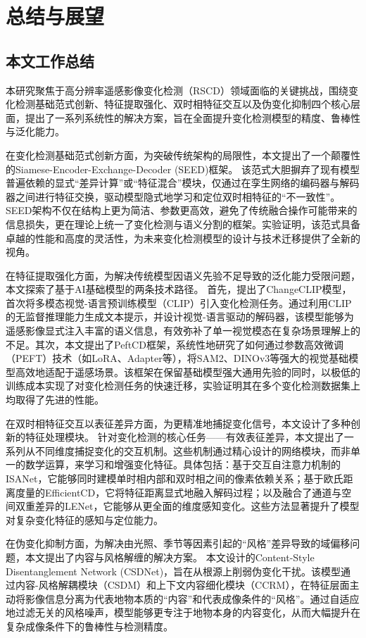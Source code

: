 
\chapter{总结与展望}

\section{本文工作总结}

本研究聚焦于高分辨率遥感影像变化检测（RSCD）领域面临的关键挑战，围绕变化检测基础范式创新、特征提取强化、双时相特征交互以及伪变化抑制四个核心层面，提出了一系列系统性的解决方案，旨在全面提升变化检测模型的精度、鲁棒性与泛化能力。

在变化检测基础范式创新方面，为突破传统架构的局限性，本文提出了一个颠覆性的Siamese-Encoder-Exchange-Decoder (SEED)框架。 该范式大胆摒弃了现有模型普遍依赖的显式“差异计算”或“特征混合”模块，仅通过在孪生网络的编码器与解码器之间进行特征交换，驱动模型隐式地学习和定位双时相特征的“不一致性”。SEED架构不仅在结构上更为简洁、参数更高效，避免了传统融合操作可能带来的信息损失，更在理论上统一了变化检测与语义分割的框架。实验证明，该范式具备卓越的性能和高度的灵活性，为未来变化检测模型的设计与技术迁移提供了全新的视角。

在特征提取强化方面，为解决传统模型因语义先验不足导致的泛化能力受限问题，本文探索了基于AI基础模型的两条技术路径。 首先，提出了ChangeCLIP模型，首次将多模态视觉-语言预训练模型（CLIP）引入变化检测任务。通过利用CLIP的无监督推理能力生成文本提示，并设计视觉-语言驱动的解码器，该模型能够为遥感影像显式注入丰富的语义信息，有效弥补了单一视觉模态在复杂场景理解上的不足。其次，本文提出了PeftCD框架，系统性地研究了如何通过参数高效微调（PEFT）技术（如LoRA、Adapter等），将SAM2、DINOv3等强大的视觉基础模型高效地适配于遥感场景。该框架在保留基础模型强大通用先验的同时，以极低的训练成本实现了对变化检测任务的快速迁移，实验证明其在多个变化检测数据集上均取得了先进的性能。

在双时相特征交互以表征差异方面，为更精准地捕捉变化信号，本文设计了多种创新的特征处理模块。 针对变化检测的核心任务——有效表征差异，本文提出了一系列从不同维度捕捉变化的交互机制。这些机制通过精心设计的网络模块，而非单一的数学运算，来学习和增强变化特征。具体包括：基于交互自注意力机制的ISANet，它能够同时建模单时相内部和双时相之间的像素依赖关系；基于欧氏距离度量的EfficientCD，它将特征距离显式地融入解码过程；以及融合了通道与空间双重差异的LENet，它能够从更全面的维度感知变化。这些方法显著提升了模型对复杂变化特征的感知与定位能力。


在伪变化抑制方面，为解决由光照、季节等因素引起的“风格”差异导致的域偏移问题，本文提出了内容与风格解缠的解决方案。 本文设计的Content-Style Disentanglement Network (CSDNet)，旨在从根源上削弱伪变化干扰。该模型通过内容-风格解耦模块（CSDM）和上下文内容细化模块（CCRM），在特征层面主动将影像信息分离为代表地物本质的“内容”和代表成像条件的“风格”。通过自适应地过滤无关的风格噪声，模型能够更专注于地物本身的内容变化，从而大幅提升在复杂成像条件下的鲁棒性与检测精度。



